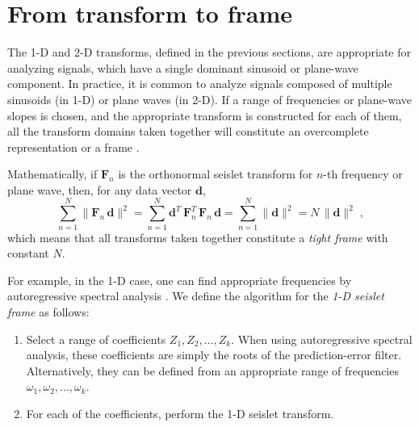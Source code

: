 
\section{From transform to frame}

The 1-D and 2-D transforms, defined in the previous sections, are appropriate 
for analyzing signals, which have a single dominant sinusoid or plane-wave 
component. In practice, it is common to analyze signals composed of multiple 
sinusoids (in 1-D) or plane waves (in 2-D). If a range of frequencies or 
plane-wave slopes is chosen, and the appropriate transform is constructed for 
each of them, all the transform domains taken together will constitute an 
overcomplete representation or a frame \cite[]{mallat}.

{Mathematically, if $\mathbf{F}_n$ is the orthonormal seislet transform for $n$-th frequency or plane wave, 
then, for any data vector $\mathbf{d}$,
\begin{equation}
\label{eq:frame}
\sum\limits_{n=1}^N \|\mathbf{F}_n\,\mathbf{d}\|^2 = \sum\limits_{n=1}^N \mathbf{d}^T\,\mathbf{F}_n^T\,\mathbf{F}_n\,\mathbf{d} =
\sum\limits_{n=1}^N \|\mathbf{d}\|^2 = N\,\|\mathbf{d}\|^2\;,
\end{equation}
which means that all transforms taken together constitute a \emph{tight frame} with constant $N$.}

For example, in the 1-D case, one can find appropriate frequencies by
autoregressive spectral analysis
\cite[]{Burg75,marple}. We define the algorithm for the \emph{1-D
  seislet frame} as follows:
\begin{enumerate}
\item Select a range of coefficients $Z_1, Z_2, \ldots, Z_k$. When
  using autoregressive spectral analysis, these coefficients are
  simply the roots of the prediction-error filter. Alternatively, they
  can be defined from an appropriate range of frequencies 
  $\omega_1, \omega_2, \ldots, \omega_k$.
\item For each of the coefficients, perform the 1-D
  seislet transform. 
\end{enumerate}

